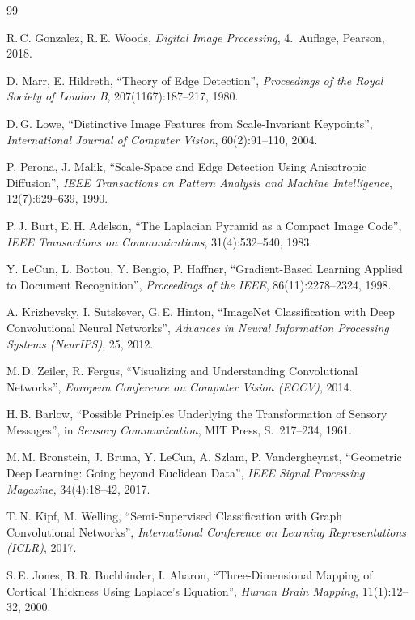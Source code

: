 ﻿\documentclass[a4paper,12pt]{article}
\theoremstyle{definition}
\begin{document}
\begin{thebibliography}{99}

R.\,C. Gonzalez, R.\,E. Woods,
\textit{Digital Image Processing}, 4.~Auflage,
Pearson, 2018.

D. Marr, E. Hildreth,
``Theory of Edge Detection'',
\textit{Proceedings of the Royal Society of London B}, 207(1167):187--217, 1980.

D.\,G. Lowe,
``Distinctive Image Features from Scale-Invariant Keypoints'',
\textit{International Journal of Computer Vision}, 60(2):91--110, 2004.

P. Perona, J. Malik,
``Scale-Space and Edge Detection Using Anisotropic Diffusion'',
\textit{IEEE Transactions on Pattern Analysis and Machine Intelligence},
12(7):629--639, 1990.

P.\,J. Burt, E.\,H. Adelson,
``The Laplacian Pyramid as a Compact Image Code'',
\textit{IEEE Transactions on Communications}, 31(4):532--540, 1983.

Y. LeCun, L. Bottou, Y. Bengio, P. Haffner,
``Gradient-Based Learning Applied to Document Recognition'',
\textit{Proceedings of the IEEE}, 86(11):2278--2324, 1998.

A. Krizhevsky, I. Sutskever, G.\,E. Hinton,
``ImageNet Classification with Deep Convolutional Neural Networks'',
\textit{Advances in Neural Information Processing Systems (NeurIPS)}, 25, 2012.

M.\,D. Zeiler, R. Fergus,
``Visualizing and Understanding Convolutional Networks'',
\textit{European Conference on Computer Vision (ECCV)}, 2014.

H.\,B. Barlow,
``Possible Principles Underlying the Transformation of Sensory Messages'',
in \textit{Sensory Communication}, MIT Press, S.~217--234, 1961.

M.\,M. Bronstein, J. Bruna, Y. LeCun, A. Szlam, P. Vandergheynst,
``Geometric Deep Learning: Going beyond Euclidean Data'',
\textit{IEEE Signal Processing Magazine}, 34(4):18--42, 2017.

T.\,N. Kipf, M. Welling,
``Semi-Supervised Classification with Graph Convolutional Networks'',
\textit{International Conference on Learning Representations (ICLR)}, 2017.

S.\,E. Jones, B.\,R. Buchbinder, I. Aharon,
``Three-Dimensional Mapping of Cortical Thickness Using Laplace's Equation'',
\textit{Human Brain Mapping}, 11(1):12--32, 2000.


\end{thebibliography}
\end{document}
